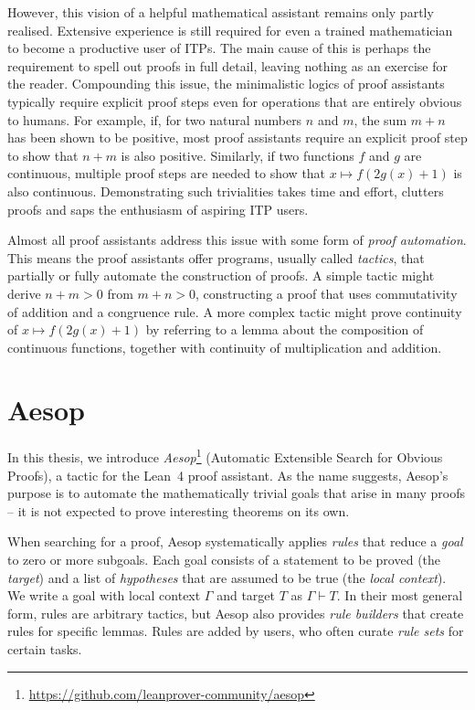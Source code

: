 However, this vision of a helpful mathematical assistant remains only partly realised.
Extensive experience is still required for even a trained mathematician to become a productive user of ITPs.
The main cause of this is perhaps the requirement to spell out proofs in full detail, leaving nothing as an exercise for the reader.
Compounding this issue, the minimalistic logics of proof assistants typically require explicit proof steps even for operations that are entirely obvious to humans.
For example, if, for two natural numbers $n$ and $m$, the sum $m + n$ has been shown to be positive, most proof assistants require an explicit proof step to show that $n + m$ is also positive.
Similarly, if two functions $f$ and $g$ are continuous, multiple proof steps are needed to show that $x ↦ f(2g(x) + 1)$ is also continuous.
Demonstrating such trivialities takes time and effort, clutters proofs and saps the enthusiasm of aspiring ITP users.

Almost all proof assistants address this issue with some form of \emph{proof automation}.
This means the proof assistants offer programs, usually called \emph{tactics}, that partially or fully automate the construction of proofs.
A simple tactic might derive $n + m > 0$ from $m + n > 0$, constructing a proof that uses commutativity of addition and a congruence rule.
A more complex tactic might prove continuity of $x ↦ f(2g(x) + 1)$ by referring to a lemma about the composition of continuous functions, together with continuity of multiplication and addition.

\section{Aesop}%
\label{sec:intro:aesop}

In this thesis, we introduce \emph{Aesop}\footnote{\url{https://github.com/leanprover-community/aesop}} (Automatic Extensible Search for Obvious Proofs), a tactic for the Lean~4 proof assistant.
As the name suggests, Aesop's purpose is to automate the mathematically trivial goals that arise in many proofs -- it is not expected to prove interesting theorems on its own.

When searching for a proof, Aesop systematically applies \emph{rules} that reduce a \emph{goal} to zero or more subgoals.
Each goal consists of a statement to be proved (the \emph{target}) and a list of \emph{hypotheses} that are assumed to be true (the \emph{local context}).
We write a goal with local context $Γ$ and target $T$ as $Γ ⊢ T$.
In their most general form, rules are arbitrary tactics, but Aesop also provides \emph{rule builders} that create rules for specific lemmas.
Rules are added by users, who often curate \emph{rule sets} for certain tasks.

